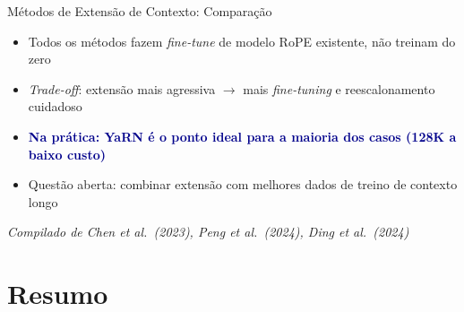 \documentclass[aspectratio=169, xcolor=dvipsnames]{beamer}
\begin{document}
  \begin{frame}{Métodos de Extensão de Contexto: Comparação}
    \centering

    \flushleft
    \begin{itemize}
      \item Todos os métodos fazem \textit{fine-tune} de modelo RoPE existente, não treinam do zero
      \item \textit{Trade-off}: extensão mais agressiva $\to$ mais \textit{fine-tuning} e reescalonamento cuidadoso
      \item \textcolor{DarkBlue}{\textbf{Na prática: YaRN é o ponto ideal para a maioria dos casos (128K a baixo custo)}}
      \item Questão aberta: combinar extensão com melhores dados de treino de contexto longo
    \end{itemize}

    {\scriptsize\textit{Compilado de Chen et al.\ (2023), Peng et al.\ (2024), Ding et al.\ (2024)}}
  \end{frame}

  \section*{Resumo}
\end{document}
